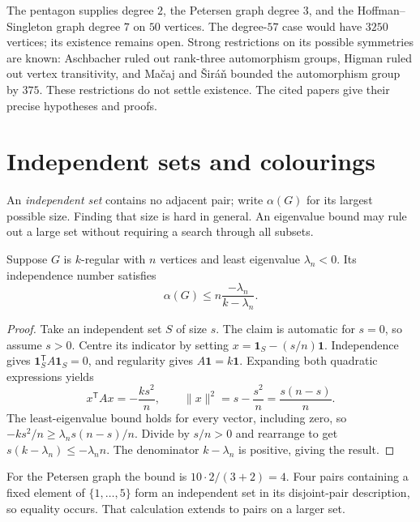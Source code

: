 The pentagon supplies degree $2$, the Petersen graph degree $3$, and the Hoffman--Singleton graph degree $7$ on $50$ vertices. The degree-$57$ case would have $3250$ vertices; its existence remains open. Strong restrictions on its possible symmetries are known: Aschbacher ruled out rank-three automorphism groups, Higman ruled out vertex transitivity, and Ma\v caj and \v Sir\'a\v n bounded the automorphism group by $375$. These restrictions do not settle existence. The cited papers give their precise hypotheses and proofs.

\section{Independent sets and colourings}

An \emph{independent set} contains no adjacent pair; write $\alpha(G)$ for its largest possible size. Finding that size is hard in general. An eigenvalue bound may rule out a large set without requiring a search through all subsets.

\begin{theorem}\label{linear:thm:hoffman}
Suppose $G$ is $k$-regular with $n$ vertices and least eigenvalue $\lambda_n<0$. Its independence number satisfies
\[
\alpha(G)\le n\frac{-\lambda_n}{k-\lambda_n}.
\]
\end{theorem}
\begin{proof}
Take an independent set $S$ of size $s$. The claim is automatic for $s=0$, so assume $s>0$. Centre its indicator by setting $x=\mathbf1_S-(s/n)\mathbf1$. Independence gives $\mathbf1_S^{\mathsf T}A\mathbf1_S=0$, and regularity gives $A\mathbf1=k\mathbf1$. Expanding both quadratic expressions yields
\[
x^{\mathsf T}Ax=-\frac{ks^2}{n},\qquad
\|x\|^2=s-\frac{s^2}{n}=\frac{s(n-s)}n.
\]
The least-eigenvalue bound holds for every vector, including zero, so
$-ks^2/n\ge\lambda_ns(n-s)/n$.
Divide by $s/n>0$ and rearrange to get $s(k-\lambda_n)\le-\lambda_nn$. The denominator $k-\lambda_n$ is positive, giving the result.
\end{proof}

For the Petersen graph the bound is $10\cdot2/(3+2)=4$. Four pairs containing a fixed element of $\{1,\ldots,5\}$ form an independent set in its disjoint-pair description, so equality occurs. That calculation extends to pairs on a larger set.

